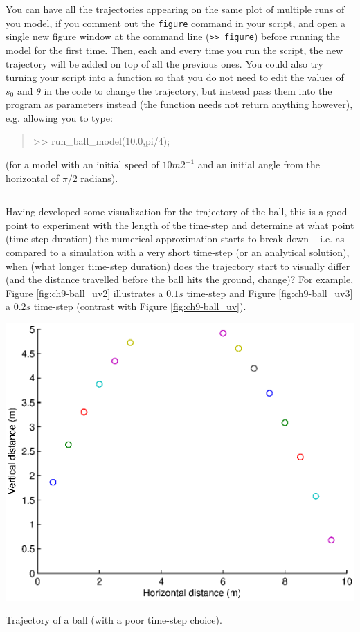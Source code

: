\documentclass{tufte-book} %
\newenvironment{docspec}{\begin{quotation}\ttfamily\parskip0pt\parindent0pt\ignorespaces}{\end{quotation}}
\begin{document}
You can have all the trajectories appearing on the same plot of multiple runs of you model, if you comment out the \texttt{figure} command in your script, and open a single new figure window at the command line (\texttt{>> figure}) before running the model for the first time. Then, each and every time you run the script, the new trajectory will be added on top of all the previous ones. You could also try turning your script into a function so that you do not need to edit the values of \(s_{0}\) and \(\theta\) in the code to change the trajectory, but instead pass them into the program as parameters instead (the function needs not return anything however), e.g. allowing you to type:
\begin{docspec}
>> run\_ball\_model(10.0,pi/4);
\end{docspec}
(for a model with an initial speed of \(10 m2^{-1}\) and an initial angle from the horizontal of \(\pi /2\) radians).

\vspace{1mm}
\noindent\rule{4cm}{0.5pt}
\vspace{2mm}

\noindent Having developed some visualization for the trajectory of the ball, this is a good point to experiment with the length of the time-step and determine at what point (time-step duration) the numerical approximation starts to break down -- i.e. as compared to a simulation with a very short time-step (or an analytical solution), when (what longer time-step duration) does the trajectory start to visually differ (and the distance travelled before the ball hits the ground, change)? For example, Figure \ref{fig:ch9-ball_uv2} illustrates a \(0.1s\) time-step and Figure \ref{fig:ch9-ball_uv3} a \(0.2s\) time-step (contrast with Figure \ref{fig:ch9-ball_uv}).

\begin{marginfigure}[-0.0in]
\includegraphics[width=\linewidth]{ch9-ball_uv2.eps}
\caption{Trajectory of a ball (with a poor time-step choice).}
\label{fig:ch9-ball_uv2}
\end{marginfigure}
\end{document}
